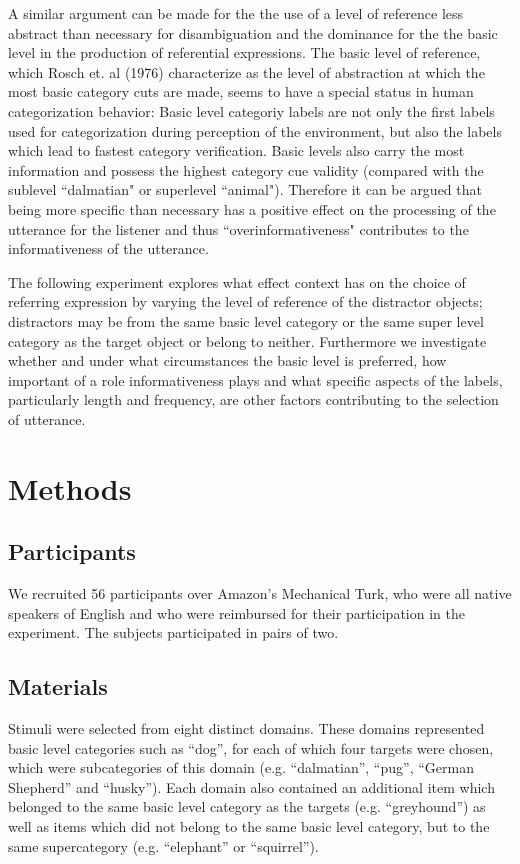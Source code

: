\documentclass[10pt,letterpaper]{article}
\begin{document}
A similar argument can be made for the the use of a level of reference less abstract than necessary for disambiguation and the dominance for the the basic level in the production of referential expressions. The basic level of reference, which Rosch et. al (1976) characterize as the level of abstraction at which the most basic category cuts are made, seems to have a special status in human categorization behavior: Basic level categoriy labels are not only the first labels used for categorization during perception of the environment, but also the labels which lead to fastest category verification. Basic levels also carry the most information and possess the highest category cue validity (compared with the sublevel “dalmatian" or superlevel “animal"). Therefore it can be argued that being more specific than necessary has a positive effect on the processing of the utterance for the listener and thus “overinformativeness" contributes to the informativeness of the utterance.

The following experiment explores what effect context has on the choice of referring expression by varying the level of reference of the distractor objects; distractors may be from the same basic level category or the same super level category as the target object or belong to neither. Furthermore we investigate whether and under what circumstances the basic level is preferred, how important of a role informativeness plays and what specific aspects of the labels, particularly length and frequency, are other factors contributing to the selection of utterance. 

\section{\bf Methods}

\subsection{\bf Participants}
We recruited 56 participants over Amazon’s Mechanical Turk, who were all native speakers of English and who were reimbursed for their participation in the experiment. The subjects participated in pairs of two.

\subsection{\bf Materials}
Stimuli were selected from eight distinct domains. These domains represented basic level categories such as “dog”, for each of which four targets were chosen, which were subcategories of this domain (e.g. “dalmatian”, “pug”, “German Shepherd” and “husky”). Each domain also contained an additional item which belonged to the same basic level category as the targets (e.g. “greyhound”) as well as items which did not belong to the same basic level category, but to the same supercategory (e.g. “elephant” or “squirrel”). 
\end{document}
